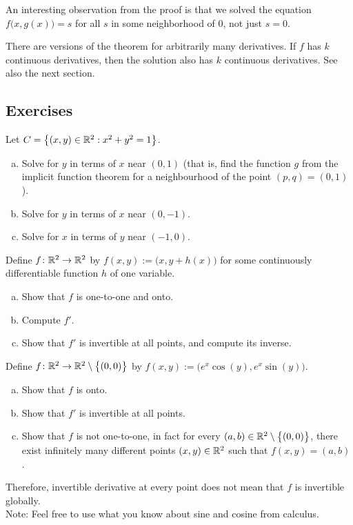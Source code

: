 An interesting observation from the proof is that we solved the equation
$f\bigl(x,g(x)\bigr) = s$ for all $s$ in some neighborhood of $0$, not just
$s=0$.

\begin{remark}
There are versions of the theorem for arbitrarily many derivatives.
If $f$ has $k$ continuous derivatives, then the solution also has $k$
continuous derivatives.  See also the next section.
\end{remark}


\subsection{Exercises}

\begin{exercise}
Let $C = \bigl\{ (x,y) \in {\mathbb{R}}^2 : x^2+y^2 = 1 \bigr\}$.
\begin{enumerate}[a)]
\item
Solve for $y$ in terms of $x$ near $(0,1)$ (that is, find the function $g$
from the implicit function theorem for a neighbourhood of the point $(p,q) = (0,1)$).
\item
Solve for $y$ in terms of $x$ near $(0,-1)$.
\item
Solve for $x$ in terms of $y$ near $(-1,0)$.
\end{enumerate}
\end{exercise}

\begin{exercise}
Define $f \colon {\mathbb{R}}^2 \to {\mathbb{R}}^2$ by $f(x,y) :=
\bigl(x,y+h(x)\bigr)$ for some continuously differentiable function $h$ of one
variable.
\begin{enumerate}[a)]
\item
Show that $f$ is one-to-one and onto.
\item
Compute $f'$.
\item
Show that $f'$ is invertible at all points, and compute
its inverse.
\end{enumerate}
\end{exercise}

\begin{exercise}
Define $f \colon {\mathbb{R}}^2 \to {\mathbb{R}}^2 \setminus \bigl\{ (0,0) \bigr\}$ by $f(x,y) :=
\bigl(e^x\cos(y),e^x\sin(y)\bigr)$.
\begin{enumerate}[a)]
\item
Show that $f$ is onto.
\item
Show that $f'$ is invertible at all points.
\item
Show that $f$ is not one-to-one, in fact for every $(a,b) \in {\mathbb{R}}^2
\setminus \bigl\{ (0,0) \bigr\}$,
there exist infinitely many different points $(x,y) \in {\mathbb{R}}^2$ such that 
$f(x,y) = (a,b)$.
\end{enumerate}
Therefore, invertible derivative at every point does not mean that
$f$ is invertible globally.\\
Note: Feel free to use what you know about sine and cosine from calculus.
\end{exercise}


